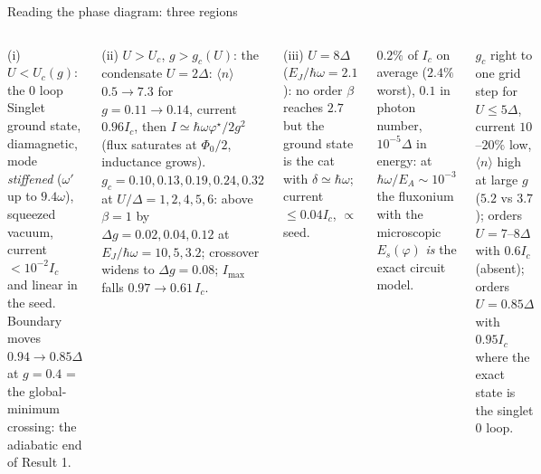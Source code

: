 \documentclass[aspectratio=169,9pt]{beamer}
\newcommand{\hw}{\hbar\omega}
\begin{document}
\begin{frame}{Reading the phase diagram: three regions}
  \begin{columns}[T]
    \begin{exampleblock}{(i) $U<U_c(g)$: the $0$ loop}
      \footnotesize Singlet ground state, diamagnetic, mode \emph{stiffened} ($\omega'$ up to $9.4\omega$), squeezed vacuum,
      current $<10^{-2}I_c$ and linear in the seed. Boundary moves $0.94\to0.85\Delta$ at $g=0.4$ = the global-minimum
      crossing: the adiabatic end of Result 1.
    \end{exampleblock}
    \begin{alertblock}{(ii) $U>U_c$, $g>g_c(U)$: the condensate}
      \footnotesize $U=2\Delta$: $\langle n\rangle$ $0.5\to7.3$ for $g=0.11\to0.14$, current $0.96I_c$, then
      $I\simeq\hw\varphi^\star/2g^2$ (flux saturates at $\Phi_0/2$, inductance grows).
      $g_c=0.10,0.13,0.19,0.24,0.32$ at $U/\Delta=1,2,4,5,6$: \alert{above $\beta=1$} by $\Delta g=0.02,0.04,0.12$
      at $E_J/\hw=10,5,3.2$; crossover widens to $\Delta g=0.08$; $I_{\max}$ falls $0.97\to0.61\,I_c$.
    \end{alertblock}
    \begin{block}{(iii) $U=8\Delta$ ($E_J/\hw=2.1$): no order}
      \footnotesize $\beta$ reaches $2.7$ but the ground state is the cat with $\delta\simeq\hw$; current $\le0.04I_c$,
      $\propto$ seed.
    \end{block}
    \begin{calcbox}[title={Full DMRG vs circuit model, above threshold}]
      \footnotesize $0.2\%$ of $I_c$ on average ($2.4\%$ worst), $0.1$ in photon number, $10^{-5}\Delta$ in energy:
      at $\hw/E_A\sim10^{-3}$ the fluxonium with the microscopic $E_s(\varphi)$ \emph{is} the exact circuit model.
    \end{calcbox}
    \begin{warnbox}[title={Mean field}]
      \footnotesize $g_c$ right to one grid step for $U\le5\Delta$, current $10$--$20\%$ low, $\langle n\rangle$ high at large $g$
      ($5.2$ vs $3.7$); orders $U=7$--$8\Delta$ with $0.6I_c$ (absent); orders $U=0.85\Delta$ with $0.95I_c$ where the exact
      state is the singlet $0$ loop.
    \end{warnbox}
  \end{columns}
\end{frame}
\end{document}
